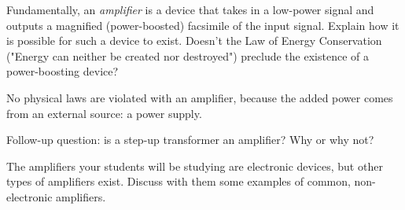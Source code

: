 

Fundamentally, an {\it amplifier} is a device that takes in a low-power signal and outputs a magnified (power-boosted) facsimile of the input signal.  Explain how it is possible for such a device to exist.  Doesn't the Law of Energy Conservation ("Energy can neither be created nor destroyed") preclude the existence of a power-boosting device?







No physical laws are violated with an amplifier, because the added power comes from an external source: a power supply.

\vskip 10pt

Follow-up question: is a step-up transformer an amplifier?  Why or why not?







The amplifiers your students will be studying are electronic devices, but other types of amplifiers exist.  Discuss with them some examples of common, non-electronic amplifiers.



